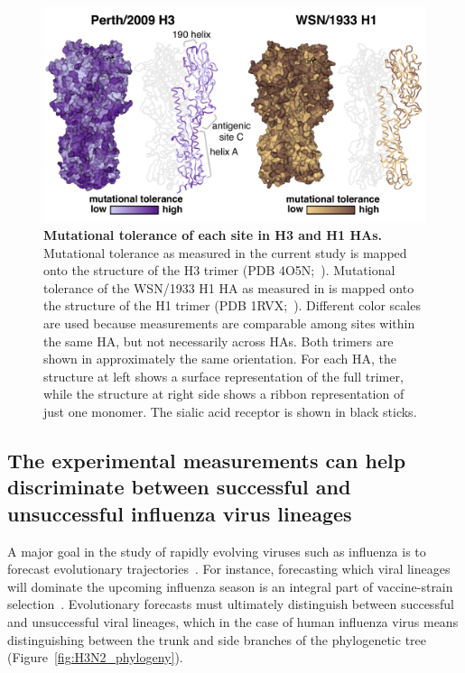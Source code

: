 \documentclass[9pt,twocolumn,twoside]{pnas-new}
\begin{document}
\begin{figure}
\centering
\includegraphics[width=\columnwidth]{figs/mut_tolerance/entropy_heatmap.pdf}
\caption{\label{fig:mut_tolerance}
{\bf Mutational tolerance of each site in H3 and H1 HAs.}
Mutational tolerance as measured in the current study is mapped onto the structure of the H3 trimer (PDB 4O5N;~\cite{lee2014receptor}).
Mutational tolerance of the WSN/1933 H1 HA as measured in \cite{doud2016accurate} is mapped onto the structure of the H1 trimer (PDB 1RVX;~\cite{gamblin2004structure}).
Different color scales are used because measurements are comparable among sites within the same HA, but not necessarily across HAs.
Both trimers are shown in approximately the same orientation. 
For each HA, the structure at left shows a surface representation of the full trimer, while the structure at right side shows a ribbon representation of just one monomer.
The sialic acid receptor is shown in black sticks.
}
\end{figure}

\subsection*{The experimental measurements can help discriminate between successful and unsuccessful influenza virus lineages}
A major goal in the study of rapidly evolving viruses such as influenza is to forecast evolutionary trajectories~\cite{lassig2017predicting,morris2017predictive}.
For instance, forecasting which viral lineages will dominate the upcoming influenza season is an integral part of vaccine-strain selection~\cite{neher2015nextflu,lassig2017predicting,morris2017predictive}. 
Evolutionary forecasts must ultimately distinguish between successful and unsuccessful viral lineages, which in the case of human influenza virus means distinguishing between the trunk and side branches of the phylogenetic tree (Figure~\ref{fig:H3N2_phylogeny}).
\end{document}
